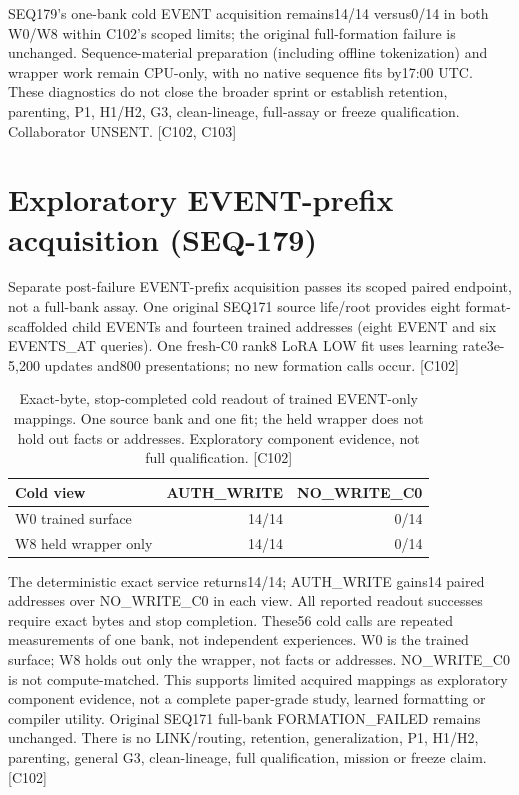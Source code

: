 \documentclass{article}
\begin{document}
SEQ179's one-bank cold EVENT acquisition remains14/14 versus0/14 in both
W0/W8 within C102's scoped limits; the original full-formation failure is
unchanged. Sequence-material preparation (including offline tokenization)
and wrapper work remain CPU-only, with no native sequence fits by17:00 UTC.
These diagnostics do not close the broader sprint or establish retention,
parenting, P1, H1/H2, G3, clean-lineage, full-assay or freeze qualification.
Collaborator UNSENT. [C102, C103]

\section{Exploratory EVENT-prefix acquisition (SEQ-179)}
Separate post-failure EVENT-prefix acquisition passes its scoped paired
endpoint, not a full-bank assay. One original SEQ171 source life/root provides
eight format-scaffolded child EVENTs and fourteen trained addresses (eight
EVENT and six EVENTS\_AT queries). One fresh-C0 rank8 LoRA LOW fit uses learning
rate3e-5,200 updates and800 presentations; no new formation calls occur. [C102]

\begin{table}[ht]
\centering\small
\begin{tabular}{lrr}
\toprule
Cold view & AUTH\_WRITE & NO\_WRITE\_C0 \\
\midrule
W0 trained surface & 14/14 & 0/14 \\
W8 held wrapper only & 14/14 & 0/14 \\
\bottomrule
\end{tabular}
\caption{Exact-byte, stop-completed cold readout of trained EVENT-only mappings.
One source bank and one fit; the held wrapper does not hold out facts or
addresses. Exploratory component evidence, not full qualification. [C102]}
\end{table}

The deterministic exact service returns14/14; AUTH\_WRITE gains14 paired
addresses over NO\_WRITE\_C0 in each view. All reported readout successes require
exact bytes and stop completion. These56 cold calls are repeated measurements
of one bank, not independent experiences. W0 is the trained surface; W8 holds
out only the wrapper, not facts or addresses. NO\_WRITE\_C0 is not compute-matched.
This supports limited acquired mappings as exploratory component evidence,
not a complete paper-grade study, learned formatting or compiler utility.
Original SEQ171 full-bank FORMATION\_FAILED remains unchanged. There is no
LINK/routing, retention, generalization, P1, H1/H2, parenting, general G3,
clean-lineage, full qualification, mission or freeze claim. [C102]
\end{document}
